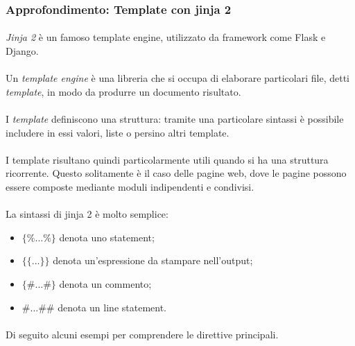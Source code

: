 \documentclass[11pt,a4paper,english]{article}
\begin{document}
\subsubsection{Approfondimento: Template con jinja 2}

\paragraph{} \emph{Jinja 2} è un famoso template engine, utilizzato da framework come Flask e Django.

\paragraph{} Un \emph{template engine} è una libreria che si occupa di elaborare particolari file, detti \emph{template}, in modo da produrre un documento risultato. 

\paragraph{} I \emph{template} definiscono una struttura: tramite una particolare sintassi è possibile includere in essi valori, liste o persino altri template. 

\paragraph{} I template risultano quindi particolarmente utili quando si ha una struttura ricorrente. Questo solitamente è il caso delle pagine web, dove le pagine possono essere composte mediante moduli indipendenti e condivisi.

\paragraph{} La sintassi di jinja 2 è molto semplice:
\begin{itemize}
    \item $\{\% ... \%\}$ denota uno statement;
    \item $\{\{ ... \}\}$ denota un'espressione da stampare nell'output;
    \item $\{\# ... \#\}$ denota un commento;
    \item $\# ... \#\#$ denota un line statement.
\end{itemize}

\paragraph{} Di seguito alcuni esempi per comprendere le direttive principali.
\end{document}
